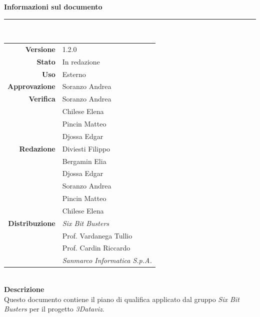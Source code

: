 \begin{titlepage}
\begin{center}
	\large \textbf{Informazioni sul documento} \\
	\rule{0.6\textwidth}{0.4pt}
	\\[0.5cm]
	\begin{tabular}{r|l}
		\textbf{Versione} & 1.2.0\\
		\textbf{Stato} & In redazione\\
		\textbf{Uso} & Esterno\\                         
		\textbf{Approvazione} & Soranzo Andrea\\                      
		\textbf{Verifica} & Soranzo Andrea\\ & Chilese Elena\\ & Pincin Matteo \\ & Djossa Edgar\\                         
		\textbf{Redazione} & Diviesti Filippo \\ & Bergamin Elia \\ & Djossa Edgar \\ & Soranzo Andrea \\ & Pincin Matteo \\ & Chilese Elena\\ 
		\textbf{Distribuzione} & \textit{Six Bit Busters} \\ & Prof. Vardanega Tullio \\ & Prof. Cardin Riccardo \\ & \textit{Sanmarco Informatica S.p.A.}
	\end{tabular}	
	\\[0.8cm]

	\large \textbf{Descrizione} \\
	Questo documento contiene il piano di qualifica applicato dal gruppo \textit{Six Bit Busters}
	per il progetto \textit{3Dataviz}.
	
	\end{center}
\end{titlepage}
